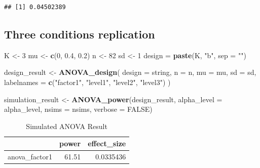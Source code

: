 \documentclass[]{book}
\newenvironment{Shaded}{\begin{snugshade}}{\end{snugshade}}
\newcommand{\DataTypeTok}[1]{\textcolor[rgb]{0.13,0.29,0.53}{#1}}
\newcommand{\DecValTok}[1]{\textcolor[rgb]{0.00,0.00,0.81}{#1}}
\newcommand{\FloatTok}[1]{\textcolor[rgb]{0.00,0.00,0.81}{#1}}
\newcommand{\KeywordTok}[1]{\textcolor[rgb]{0.13,0.29,0.53}{\textbf{#1}}}
\newcommand{\NormalTok}[1]{#1}
\newcommand{\OtherTok}[1]{\textcolor[rgb]{0.56,0.35,0.01}{#1}}
\newcommand{\StringTok}[1]{\textcolor[rgb]{0.31,0.60,0.02}{#1}}
\begin{document}
\begin{verbatim}
## [1] 0.04502389
\end{verbatim}

\hypertarget{three-conditions-replication-2}{%
\subsection{Three conditions replication}\label{three-conditions-replication-2}}

\begin{Shaded}
\begin{Highlighting}[]
\NormalTok{K <-}\StringTok{ }\DecValTok{3}
\NormalTok{mu <-}\StringTok{ }\KeywordTok{c}\NormalTok{(}\DecValTok{0}\NormalTok{, }\FloatTok{0.4}\NormalTok{, }\FloatTok{0.2}\NormalTok{)}
\NormalTok{n <-}\StringTok{ }\DecValTok{82}
\NormalTok{sd <-}\StringTok{ }\DecValTok{1}
\NormalTok{design =}\StringTok{ }\KeywordTok{paste}\NormalTok{(K, }\StringTok{"b"}\NormalTok{, }\DataTypeTok{sep =} \StringTok{""}\NormalTok{)}
\end{Highlighting}
\end{Shaded}

\begin{Shaded}
\begin{Highlighting}[]
\NormalTok{design_result <-}\StringTok{ }\KeywordTok{ANOVA_design}\NormalTok{(}
  \DataTypeTok{design =}\NormalTok{ string,}
  \DataTypeTok{n =}\NormalTok{ n,}
  \DataTypeTok{mu =}\NormalTok{ mu,}
  \DataTypeTok{sd =}\NormalTok{ sd,}
  \DataTypeTok{labelnames =} \KeywordTok{c}\NormalTok{(}\StringTok{"factor1"}\NormalTok{, }\StringTok{"level1"}\NormalTok{, }\StringTok{"level2"}\NormalTok{, }\StringTok{"level3"}\NormalTok{)}
\NormalTok{  )}
\end{Highlighting}
\end{Shaded}

\begin{Shaded}
\begin{Highlighting}[]
\NormalTok{simulation_result <-}\StringTok{ }\KeywordTok{ANOVA_power}\NormalTok{(design_result, }
                                 \DataTypeTok{alpha_level =}\NormalTok{ alpha_level, }
                                 \DataTypeTok{nsims =}\NormalTok{ nsims,}
                                 \DataTypeTok{verbose =} \OtherTok{FALSE}\NormalTok{)}
\end{Highlighting}
\end{Shaded}

\begin{table}[t]

\caption{\label{tab:unnamed-chunk-73}Simulated ANOVA Result}
\centering
\begin{tabular}{l|r|r}
\hline
  & power & effect\_size\\
\hline
anova\_factor1 & 61.51 & 0.0335436\\
\hline
\end{tabular}
\end{table}
\end{document}
